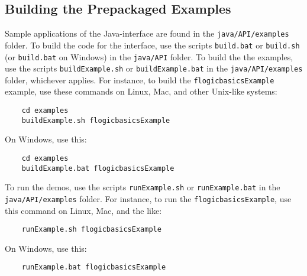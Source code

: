 \subsection{Building the Prepackaged Examples}

Sample applications of the Java-\FLSYSTEM interface
are found in the {\tt java/API/examples}  folder.
To build the code for the interface, use the scripts {\tt build.bat} or
{\tt build.sh} (or \texttt{build.bat} on Windows)
in the {\tt java/API}  folder.
To build the the examples, use the scripts
{\tt buildExample.sh} or  {\tt buildExample.bat} in the {\tt java/API/examples}
folder, whichever applies. For instance, to
build the {\tt flogicbasicsExample} example, use these commands on Linux,
Mac, and other Unix-like systems:
\begin{verbatim}
    cd examples
    buildExample.sh flogicbasicsExample
\end{verbatim}
On Windows, use this:
\begin{verbatim}
    cd examples
    buildExample.bat flogicbasicsExample
\end{verbatim}

To run the demos, use the scripts
{\tt runExample.sh} or  {\tt runExample.bat}  in the {\tt java/API/examples}
folder. For instance, to
run the {\tt flogicbasicsExample},  use this command on Linux, Mac, and the
like:
\begin{verbatim}
    runExample.sh flogicbasicsExample
\end{verbatim}
On Windows, use this:
\begin{verbatim}
    runExample.bat flogicbasicsExample
\end{verbatim}



